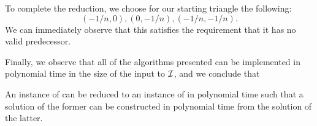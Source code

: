     To complete the reduction, we choose for our starting triangle the following: \[(-1/n,0),(0,-1/n),(-1/n,-1/n).\] We can immediately observe that this satisfies the requirement that it has no valid predecessor.

    Finally, we observe that all of the algorithms presented can be implemented in polynomial time in the size of the input to $\mbox{${\mathcal I}$}$, and we conclude that
    \begin{theorem}
An instance of \TwoDContractionMap can be reduced to an instance of \EOPL in polynomial time such that a solution of the former can be constructed in polynomial time from the solution of the latter. 
    \end{theorem}

    
  






  